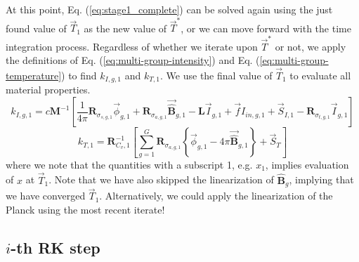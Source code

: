 \documentclass[11pt]{article}
\newcommand{\benum}{\begin{equation}}
\newcommand{\eenum}{\end{equation}}
\newcommand{\eqt}[1]{Eq. (\ref{#1})}
\newcommand{\M}{\ensuremath{ \mathbf M}}
\newcommand{\R}{\ensuremath{{\mathbf R}}}
\begin{document}
At this point, \eqt{eq:stage1_complete} can be solved again using the just found value of $\vec{T}_1$ as the new value of $\vec{T}^*$, or we can move forward with the time integration process.  
Regardless of whether we iterate upon $\vec{T}^*$ or not, we apply the definitions of \eqt{eq:multi-group-intensity} and \eqt{eq:multi-group-temperature} to find $k_{I,g,1}$ and $k_{T,1}$.  We use the final value of $\vec{T}_1$ to evaluate all material properties.
\benum
k_{I,g,1} = c\M^{-1}\left[\frac{1}{4\pi}\R_{\sigma_{s,g,1}}\vec{\phi}_{g,1} + \R_{\sigma_{a,g,1}}\vec{\widehat{\mathbf B}}_{g,1} - \mathbf{L} \vec{I}_{g,1} + \vec{f}I_{in,g,1} + \vec{S}_{I,1} - \R_{\sigma_{t,g,1}} \vec{I}_{g,1}  \right]
\eenum
\benum
k_{T,1} = \R_{C_v,1}^{-1} \left[ \sum_{g=1}^G{\R_{\sigma_{a,g,1}} \left \{\vec{\phi}_{g,1} - 4\pi \vec{\widehat{\mathbf B}}_{g,1}   \right \} } + \vec{S}_T \right]
\eenum
where we note that the quantities with a subscript 1, e.g. $x_1$, implies evaluation of $x$ at $\vec{T}_1$.  Note that we have also skipped the linearization of $\widehat{\mathbf B}_g$, implying that we have converged $\vec{T}_1$.  Alternatively, we could apply the linearization of the Planck using the most recent iterate!

\subsection{$i$-th RK step}
\end{document}
